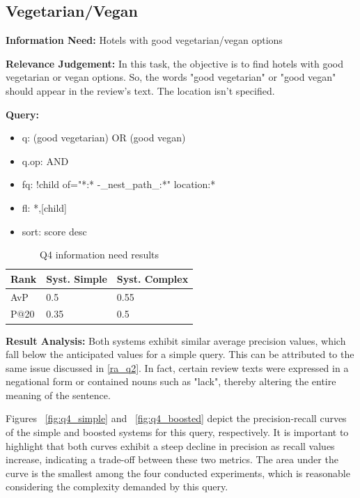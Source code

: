 \documentclass[sigconf]{acmart}
\begin{document}
\subsection{Vegetarian/Vegan}\label{subsec:q4}

\textbf{Information Need:} Hotels with good vegetarian/vegan options

\textbf{Relevance Judgement:} In this task, the objective is to find hotels with good vegetarian or vegan options. So, the words "good vegetarian" or "good vegan" should appear in the review's text. The location isn't specified.

\textbf{Query:}

\begin{itemize}
    \item q: (good vegetarian) OR (good vegan)
    \item q.op: AND
    \item fq: {!child of="*:* -\_nest\_path\_:*"} location:*
    \item fl: *,[child]
    \item sort: score desc
\end{itemize}

\begin{table}[h]
\caption{Q4 information need results}
\label{tab:q4}
\begin{tabular}{lll}
\toprule
Rank & Syst. Simple & Syst. Complex\\
\midrule
AvP & 0.5 & 0.55  \\
P@20 & 0.35 & 0.5 \\
\bottomrule
\end{tabular}
\end{table}


\textbf{Result Analysis:} Both systems exhibit similar average precision values, which fall below the anticipated values for a simple query. This can be attributed to the same issue discussed in \ref{ra_q2}. In fact, certain review texts were expressed in a negational form or contained nouns such as "lack", thereby altering the entire meaning of the sentence.

Figures ~\ref{fig:q4_simple} and ~\ref{fig:q4_boosted} depict the precision-recall curves of the simple and boosted systems for this query, respectively. It is important to highlight that both curves exhibit a steep decline in precision as recall values increase, indicating a trade-off between these two metrics. The area under the curve is the smallest among the four conducted experiments, which is reasonable considering the complexity demanded by this query.
\end{document}
